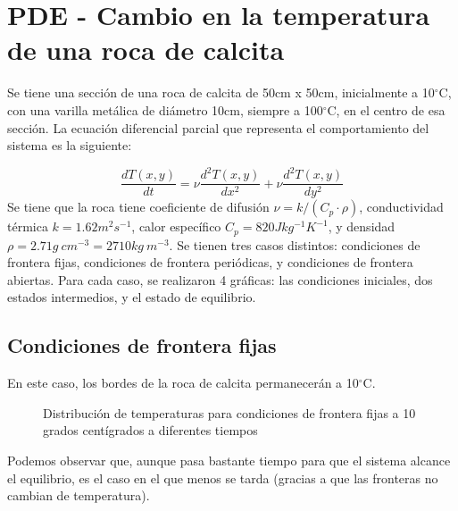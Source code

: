 \documentclass{article}
\begin{document}
\section{PDE - Cambio en la temperatura de una roca de calcita}
Se tiene una sección de una roca de calcita de 50cm x 50cm, inicialmente a 10$^\circ$C, con una varilla metálica de diámetro 10cm, siempre a 100$^\circ$C, en el centro de esa sección. La ecuación diferencial parcial que representa el comportamiento del sistema es la siguiente:

\begin{equation}
    \frac{dT(x,y)}{dt} = \nu\frac{d^{2}T(x,y)}{dx^{2}} + \nu\frac{d^{2}T(x,y)}{dy^{2}} 
\end{equation}
Se tiene que la roca tiene coeficiente de difusión $\nu = k/(C_p\cdot\rho)$, conductividad térmica $k = 1.62m^2s^{-1}$, calor específico $C_p = 820Jkg^{-1}K^{-1}$, y densidad $\rho = 2.71g\ cm^{-3} = 2710kg\ m^{-3}$. Se tienen tres casos distintos: condiciones de frontera fijas, condiciones de frontera periódicas, y condiciones de frontera abiertas. Para cada caso, se realizaron 4 gráficas: las condiciones iniciales, dos estados intermedios, y el estado de equilibrio.

\subsection*{Condiciones de frontera fijas}
En este caso, los bordes de la roca de calcita permanecerán a 10$^\circ$C.

\begin{figure}[H]
    \centering
    \label{fig:my_label}
\end{figure}
\begin{figure}[H]
    \centering
        \caption{Distribución de temperaturas para condiciones de frontera fijas a 10 grados centígrados a diferentes tiempos}
    \label{fig:my_label}
\end{figure}

Podemos observar que, aunque pasa bastante tiempo para que el sistema alcance el equilibrio, es el caso en el que menos se tarda (gracias a que las fronteras no cambian de temperatura).
\end{document}
